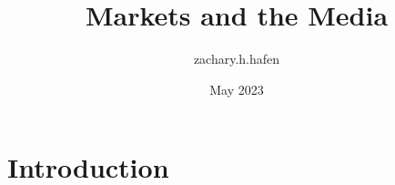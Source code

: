 \documentclass{article}
\title{Markets and the Media}
\author{zachary.h.hafen }
\date{May 2023}
\begin{document}
\maketitle

\section{Introduction}
\end{document}
